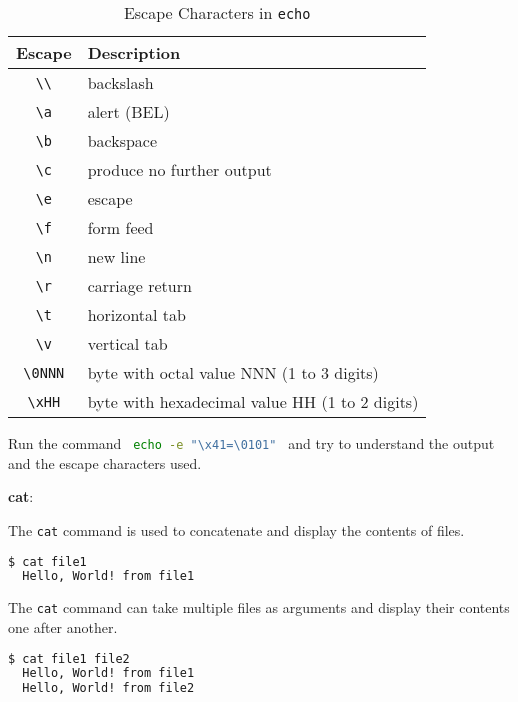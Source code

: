 \begin{table}[h!]
\caption{Escape Characters in \texttt{echo}}
\begin{tabular}{ c l }
  \toprule
 Escape & Description \\
 \midrule
  \texttt{\textbackslash\textbackslash} & backslash \\
  \texttt{\textbackslash a} & alert (BEL) \\
  \texttt{\textbackslash b} & backspace \\
  \texttt{\textbackslash c} & produce no further output \\
  \texttt{\textbackslash e} & escape \\
  \texttt{\textbackslash f} & form feed \\
  \texttt{\textbackslash n} & new line \\
  \texttt{\textbackslash r} & carriage return \\
  \texttt{\textbackslash t} & horizontal tab \\
  \texttt{\textbackslash v} & vertical tab \\
  \texttt{\textbackslash 0NNN} & byte with octal value NNN (1 to 3 digits) \\
  \texttt{\textbackslash xHH} & byte with hexadecimal value HH (1 to 2 digits) \\
  \bottomrule
\end{tabular}
\end{table}

\begin{exercise}
  Run the command
  \lstinline[language=bash]{ echo -e "\x41=\0101" } and try to understand the output and the escape characters used.
\end{exercise}

\textbf{cat}:

The \texttt{cat} command is used to concatenate and display the contents of files.

\begin{lstlisting}[language=bash]
  $ cat file1
  Hello, World! from file1
\end{lstlisting}

The \texttt{cat} command can take multiple files as arguments and display their contents one after another.

\begin{lstlisting}[language=bash]
  $ cat file1 file2
  Hello, World! from file1
  Hello, World! from file2
\end{lstlisting}

